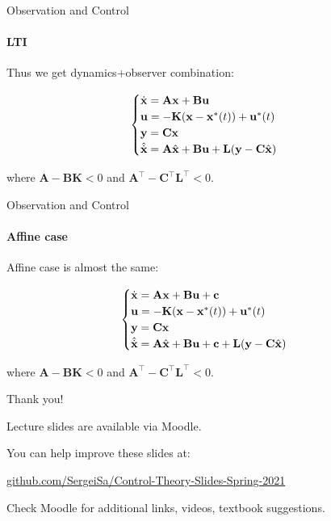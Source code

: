 \documentclass{beamer}
\begin{document}
\begin{frame}{Observation and Control}
\framesubtitle{LTI}
\begin{flushleft}

Thus we get dynamics+observer combination:

\begin{equation}
\begin{cases}
\dot {\mathbf{x}} = \mathbf{A} \mathbf{x} + \mathbf{B} \mathbf{u} \\
\mathbf{u} = -\mathbf{K} (\mathbf{x} - \mathbf{x}^*(t)) + \mathbf{u}^*(t)\\
\mathbf{y} = \mathbf{C} \mathbf{x} \\
\hat{\dot {\mathbf x}} = \mathbf A \hat{\mathbf x} + \mathbf B \mathbf u + \mathbf L(\mathbf y - \mathbf{C} \hat{\mathbf x})
\end{cases}
\end{equation}

\bigskip

where $\mathbf A - \mathbf B \mathbf K < 0$ and $\mathbf A^{\top} - 
\mathbf C^{\top} \mathbf L^{\top} < 0$.


\end{flushleft}
\end{frame}


\begin{frame}{Observation and Control}
\framesubtitle{Affine case}
\begin{flushleft}

Affine case is almost the same:

\begin{equation}
\begin{cases}
\dot {\mathbf{x}} = \mathbf{A} \mathbf{x} + \mathbf{B} \mathbf{u} + \mathbf{c} \\
\mathbf{u} = -\mathbf{K} (\mathbf{x} - \mathbf{x}^*(t)) + \mathbf{u}^*(t)\\
\mathbf{y} = \mathbf{C} \mathbf{x} \\
\hat{\dot {\mathbf x}} = \mathbf A \hat{\mathbf x} + \mathbf B \mathbf u + \mathbf{c} + \mathbf L(\mathbf y - \mathbf{C} \hat{\mathbf x})
\end{cases}
\end{equation}

\bigskip

where $\mathbf A - \mathbf B \mathbf K < 0$ and $\mathbf A^{\top} - 
\mathbf C^{\top} \mathbf L^{\top} < 0$.


\end{flushleft}
\end{frame}





\begin{frame}{Thank you!}
\centerline{Lecture slides are available via Moodle.}
\bigskip
\centerline{You can help improve these slides at:}
\centerline{\href{https://github.com/SergeiSa/Control-Theory-Slides-Spring-2021}{github.com/SergeiSa/Control-Theory-Slides-Spring-2021}}
\bigskip
\centerline{Check Moodle for additional links, videos, textbook suggestions.}
\end{frame}
\end{document}

